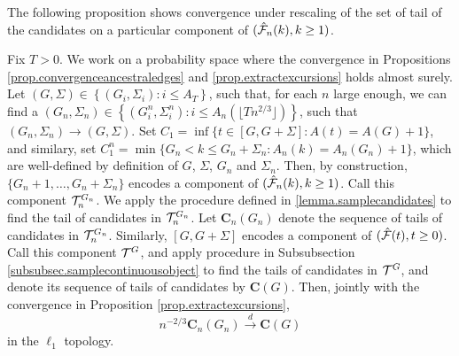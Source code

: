 The following proposition shows convergence under rescaling of the set of tail of the candidates on a particular component of $(\hat{{\mathcal F}}_n(k),k\geq 1)$. 
\begin{proposition}\label{prop.convergencestartingpointscandidates}
Fix $T>0$. We work on a probability space where the convergence in Propositions \ref{prop.convergenceancestraledges} and \ref{prop.extractexcursions} holds almost surely. Let $(G,\Sigma)\in \left\{(G_i,\Sigma_i):i\leq A_T\right\}$, such that, for each $n$ large enough, we can find a $(G_n,\Sigma_n)\in\left\{(G_i^n,\Sigma_i^n):i\leq A_n\left(\lfloor Tn^{2/3}\rfloor\right)\right\}$, such that $(G_n,\Sigma_n)\to (G,\Sigma)$. Set $C_1=\inf\{t\in [G,G+\Sigma]:A(t)=A(G)+1\}$, and similary, set $C_1^n=\min\{G_n<k\leq G_n+\Sigma_n:A_n(k)=A_n(G_n)+1\}$, which are well-defined by definition of $G$, $\Sigma$, $G_n$ and $\Sigma_n$.  Then, by construction, $\{G_n+1,\dots,G_n+\Sigma_n\}$ encodes a component of $(\hat{{\mathcal F}}_n(k),k\geq 1)$. Call this component ${\mathcal T}^{G_n}_n$. We apply the procedure defined in \ref{lemma.samplecandidates} to find the tail of candidates in ${\mathcal T}^{G_n}_n$. Let $\mathbf{C}_n(G_n)$ denote the sequence of tails of candidates in ${\mathcal T}^{G_n}_n$. Similarly, $[G,G+\Sigma]$ encodes a component of $(\hat{{\mathcal F}}(t),t\geq 0)$. Call this component ${\mathcal T}^G$, and apply procedure in Subsubsection \ref{subsubsec.samplecontinuousobject} to find the tails of candidates in ${\mathcal T}^G$, and denote its sequence of tails of candidates by $\mathbf{C}(G)$. Then, jointly with the convergence in Proposition \ref{prop.extractexcursions}, 
$$n^{-2/3}\mathbf{C}_n(G_n)\overset{d}{\to}\mathbf{C}(G)$$
in the $\ell_1$ topology.
\end{proposition}
